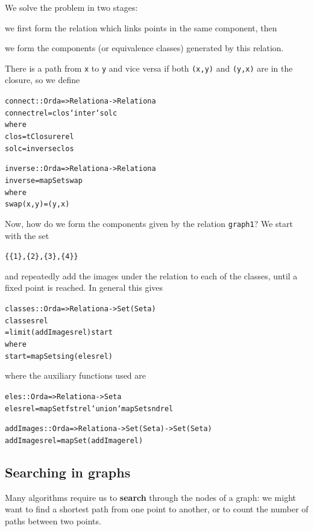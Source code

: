 We solve the problem in two stages:
\begin{titemize}
\item we first form the relation which links points in the same component,
then
\item we form the components (or equivalence classes) generated by this
relation.
\end{titemize}
There is a path from \texttt{x} to \texttt{y} and vice versa if both \texttt{(x,y)}
and \texttt{(y,x)} are in the closure, so we define
\begin{alltt}
connect :: Ord a => Relation a -> Relation a
connect rel = clos `inter` solc
              where
              clos = tClosure rel
              solc = inverse clos

inverse :: Ord a => Relation a -> Relation a
inverse = mapSet swap
          where 
          swap (x,y) = (y,x)
\end{alltt}
Now, how do we form the components given by the relation \texttt{graph1}? We start
with the set 
\begin{alltt}
\{\{1\},\{2\},\{3\},\{4\}\}
\end{alltt}
and repeatedly add the images under the relation to each of the classes,
until a fixed point is reached. In general this gives
\begin{alltt}
classes :: Ord a => Relation a -> Set (Set a)
classes rel 
  = limit (addImages rel) start
    where
    start = mapSet sing (eles rel)
\end{alltt}
where the auxiliary functions used are
\begin{alltt}
eles :: Ord a => Relation a -> Set a
eles rel = mapSet fst rel `union` mapSet snd rel

addImages :: Ord a => Relation a -> Set (Set a) -> Set (Set a)
addImages rel = mapSet (addImage rel)
\end{alltt}

\subsection*{Searching in graphs}

Many algorithms require us to \textbf{search} through the nodes of a graph: 
we might want to find a shortest path from one point to another, or to
count the number of paths between two points. 

